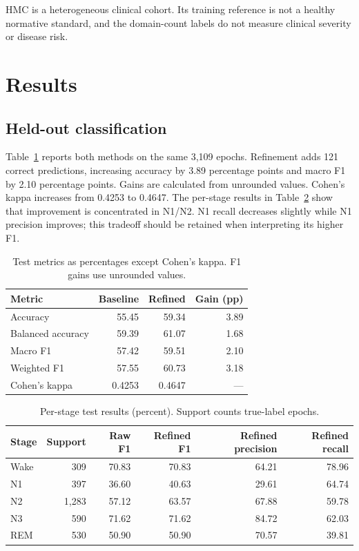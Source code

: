 \documentclass[pdflatex,sn-mathphys-num]{sn-jnl}
\begin{document}
HMC is a heterogeneous clinical cohort. Its training reference is not a healthy normative standard, and the domain-count labels do not measure clinical severity or disease risk.

\section{Results}\label{sec:results}
\subsection{Held-out classification}
Table~\ref{tab:metrics} reports both methods on the same 3,109 epochs. Refinement adds 121 correct predictions, increasing accuracy by 3.89 percentage points and macro F1 by 2.10 percentage points. Gains are calculated from unrounded values. Cohen's kappa increases from 0.4253 to 0.4647. The per-stage results in Table~\ref{tab:stages} show that improvement is concentrated in N1/N2. N1 recall decreases slightly while N1 precision improves; this tradeoff should be retained when interpreting its higher F1.

\begin{table}[htbp]
\caption{Test metrics as percentages except Cohen's kappa. F1 gains use unrounded values.}\label{tab:metrics}
\centering
\begin{tabular}{lrrr}
\toprule
Metric & Baseline & Refined & Gain (pp) \\
\midrule
Accuracy & 55.45 & 59.34 & 3.89 \\
Balanced accuracy & 59.39 & 61.07 & 1.68 \\
Macro F1 & 57.42 & 59.51 & 2.10 \\
Weighted F1 & 57.55 & 60.73 & 3.18 \\
Cohen's kappa & 0.4253 & 0.4647 & --- \\
\bottomrule
\end{tabular}
\end{table}

\begin{table}[htbp]
\caption{Per-stage test results (percent). Support counts true-label epochs.}\label{tab:stages}
\centering
\begin{tabular}{lrrrrr}
\toprule
Stage & Support & Raw F1 & Refined F1 & Refined precision & Refined recall \\
\midrule
Wake & 309 & 70.83 & 70.83 & 64.21 & 78.96 \\
N1 & 397 & 36.60 & 40.63 & 29.61 & 64.74 \\
N2 & 1,283 & 57.12 & 63.57 & 67.88 & 59.78 \\
N3 & 590 & 71.62 & 71.62 & 84.72 & 62.03 \\
REM & 530 & 50.90 & 50.90 & 70.57 & 39.81 \\
\bottomrule
\end{tabular}
\end{table}
\end{document}
